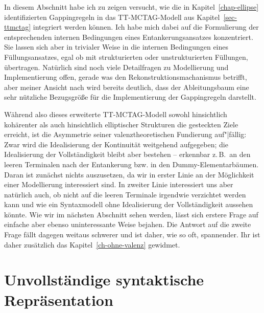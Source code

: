 In diesem Abschnitt habe ich zu zeigen versucht, wie die in Kapitel~\ref{chap-ellipse} identifizierten Gappingregeln in das TT-MCTAG-Modell aus Kapitel~\ref{sec-ttmctag} integriert werden können. Ich habe mich dabei auf die Formulierung der entsprechenden internen Bedingungen eines Entankerungsansatzes konzentriert. Sie lassen sich aber in trivialer Weise in die internen Bedingungen eines Füllungsansatzes, egal ob mit strukturierten oder unstrukturierten Füllungen, übertragen. Natürlich sind noch viele Detailfragen zu Modellierung und Implementierung offen, gerade was den Rekonstruktionsmachanismus betrifft, aber meiner Ansicht nach wird bereits deutlich, dass der Ableitungsbaum eine sehr nützliche Bezugsgrö\ss e für die Implementierung der Gappingregeln darstellt. 

Während also dieses erweiterte TT-MCTAG-Modell sowohl hinsichtlich kohärenter als auch hinsichtlich elliptischer Strukturen die gesteckten Ziele erreicht, ist die Asymmetrie seiner valenztheoretischen Fundierung auf"|fällig: Zwar wird die Idealisierung der Kontinuität weitgehend aufgegeben; die Idealisierung der Vollständigkeit bleibt aber bestehen -- erkennbar z.\,B.\ an den leeren Terminalen nach der Entankerung bzw. in den Dummy-Elementarbäumen. Daran ist zunächst nichts auszusetzen, da wir in erster Linie an der Möglichkeit einer Modellierung interessiert sind. In zweiter Linie interessiert uns aber natürlich auch, ob nicht auf die leeren Terminale irgendwie verzichtet werden kann und wie ein Syntaxmodell ohne Idealisierung der Vollständigkeit aussehen könnte. Wie wir im nächsten Abschnitt sehen werden, lässt sich erstere Frage auf einfache aber ebenso uninteressante Weise bejahen. Die Antwort auf die zweite Frage fällt dagegen weitaus schwerer und ist daher, wie so oft, spannender. Ihr ist daher zusätzlich das Kapitel~\ref{ch-ohne-valenz} gewidmet. 



\section{Unvollständige syntaktische Repräsentation} \label{sec-unvollständige-repräsentation}

